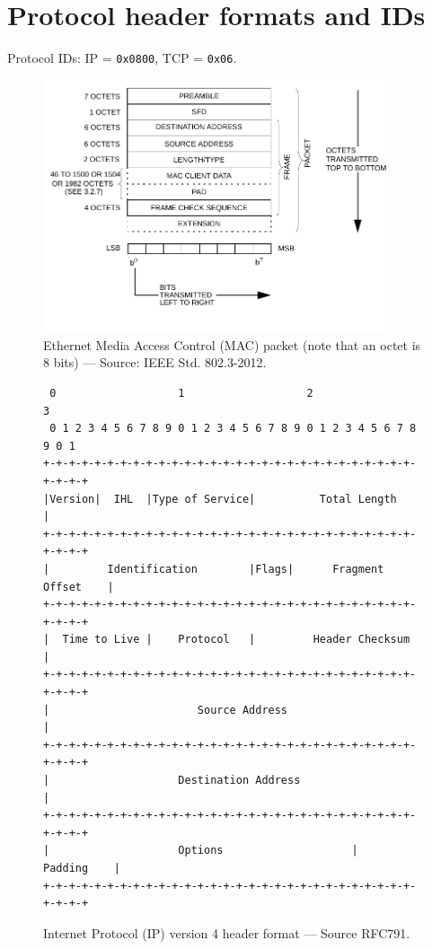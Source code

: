 \documentclass[pdftex,12pt,a4paper]{article}
\begin{document}
    \section{Protocol header formats and IDs}\label{a}
        Protocol IDs: IP = \texttt{0x0800}, TCP = \texttt{0x06}.
                \begin{figure}[tbh]
                    \centering
                    \includegraphics[width=0.9\textwidth]{figures/macpacket}
                    \vspace{-15pt}
                    \caption{Ethernet Media Access Control (MAC) packet (note
                    that an octet is 8 bits) --- Source: IEEE Std. 802.3-2012.}
                    \label{fig:macpacket}
                \end{figure}

                \begin{figure}[tbh]
                    \centering
                    \small\begin{verbatim} 0                   1                   2                   3
 0 1 2 3 4 5 6 7 8 9 0 1 2 3 4 5 6 7 8 9 0 1 2 3 4 5 6 7 8 9 0 1
+-+-+-+-+-+-+-+-+-+-+-+-+-+-+-+-+-+-+-+-+-+-+-+-+-+-+-+-+-+-+-+-+
|Version|  IHL  |Type of Service|          Total Length         |
+-+-+-+-+-+-+-+-+-+-+-+-+-+-+-+-+-+-+-+-+-+-+-+-+-+-+-+-+-+-+-+-+
|         Identification        |Flags|      Fragment Offset    |
+-+-+-+-+-+-+-+-+-+-+-+-+-+-+-+-+-+-+-+-+-+-+-+-+-+-+-+-+-+-+-+-+
|  Time to Live |    Protocol   |         Header Checksum       |
+-+-+-+-+-+-+-+-+-+-+-+-+-+-+-+-+-+-+-+-+-+-+-+-+-+-+-+-+-+-+-+-+
|                       Source Address                          |
+-+-+-+-+-+-+-+-+-+-+-+-+-+-+-+-+-+-+-+-+-+-+-+-+-+-+-+-+-+-+-+-+
|                    Destination Address                        |
+-+-+-+-+-+-+-+-+-+-+-+-+-+-+-+-+-+-+-+-+-+-+-+-+-+-+-+-+-+-+-+-+
|                    Options                    |    Padding    |
+-+-+-+-+-+-+-+-+-+-+-+-+-+-+-+-+-+-+-+-+-+-+-+-+-+-+-+-+-+-+-+-+\end{verbatim}\normalsize
                    \vspace{-15pt}
                    \caption{Internet Protocol (IP) version 4 header format --- Source RFC791.}
                    \label{fig:ipv4}
                \end{figure}
\end{document}

